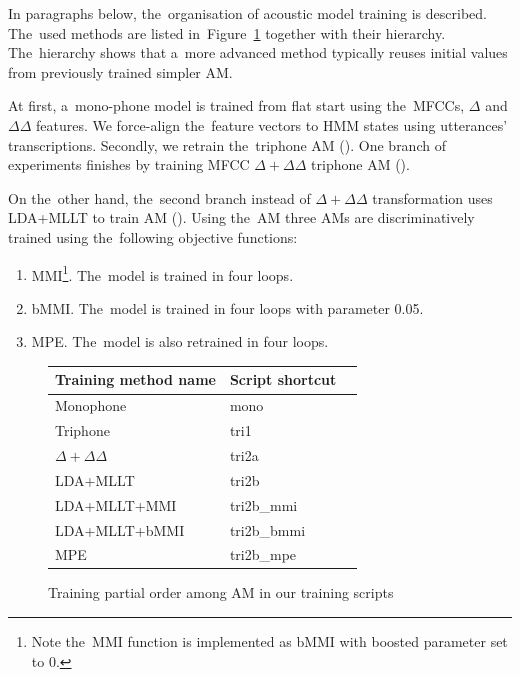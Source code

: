 In paragraphs below, the~organisation of acoustic model training is described. 
The~used methods are listed in~Figure~\ref{fig:am-deps} together with their hierarchy.
The~hierarchy shows that a~more advanced method typically reuses initial values from previously trained simpler \ac{AM}.

At first, a~mono-phone model is trained from flat start using the~MFCCs, $\Delta$ and $\Delta \Delta$ features.
We force-align the~feature vectors to HMM states using utterances' transcriptions.
Secondly, we retrain the~triphone \ac{AM} ().
One branch of experiments finishes by training \ac{MFCC} $\Delta + \Delta\Delta$ triphone \ac{AM} (). %

On the~other hand, the~second branch instead of $\Delta + \Delta\Delta$ transformation uses \ac{LDA}+\ac{MLLT} to train \ac{AM} ().
Using the~\ac{AM}  three \acp{AM} are discriminatively trained using the~following objective functions:
\begin{enumerate}
    \item \acl{MMI}\cite{chow1990maximum}\footnote{Note the~\ac{MMI} function is implemented as \acs{bMMI} with boosted parameter set to 0.}. The~model  is trained in four loops.
    \item \acl{bMMI}\cite{povey2008boosted}. The~model  is trained in four loops with parameter 0.05.
    \item \acl{MPE}\cite{povey2003mmi}. The~model  is also retrained in four loops.
\end{enumerate}

\begin{figure}[!htp]
    \begin{center}
    
    {\small \begin{tabular}{lll}
    \hline
    Training method name & Script shortcut \\
    \hline
    Monophone & mono \\
    Triphone  & tri1 \\
    $\Delta + \Delta\Delta$ & tri2a  \\
    \acs{LDA}+\acs{MLLT} & tri2b  \\
    \acs{LDA}+\acs{MLLT}+\acs{MMI} & tri2b\_mmi \\
    \acs{LDA}+\acs{MLLT}+\acs{bMMI} & tri2b\_bmmi \\
    \acs{MPE} & tri2b\_mpe \\
    \hline
    \end{tabular}}
    \end{center}
    \caption{Training partial order among \ac{AM} in our training scripts}
    \label{fig:am-deps} 
\end{figure}

